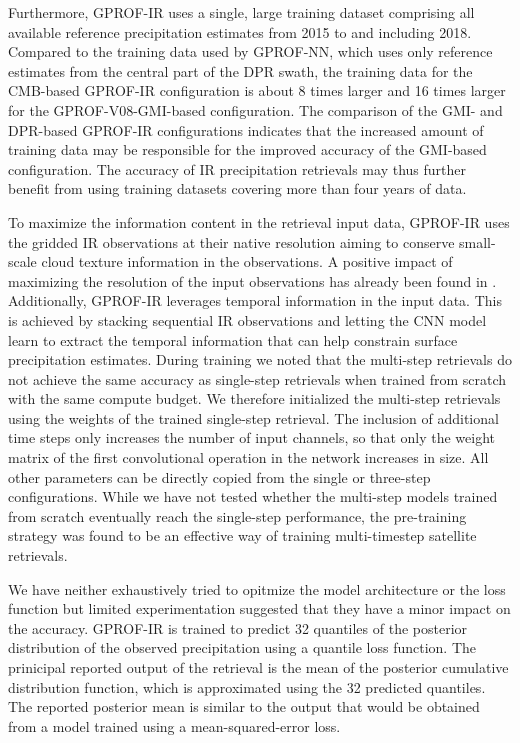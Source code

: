 \documentclass{ametsocV6.1}
\begin{document}
Furthermore, GPROF-IR uses a single, large training dataset comprising all
available reference precipitation estimates from 2015 to and including 2018.
Compared to the training data used by GPROF-NN, which uses only reference
estimates from the central part of the DPR swath, the training data for the
CMB-based GPROF-IR configuration is about 8 times larger and 16 times larger for
the GPROF-V08-GMI-based configuration. The comparison of the GMI- and DPR-based
GPROF-IR configurations indicates that the increased amount of training data may
be responsible for the improved accuracy of the GMI-based configuration. The
accuracy of IR precipitation retrievals may thus further benefit from using
training datasets covering more than four years of data.

To maximize the information content in the retrieval input data, GPROF-IR uses
the gridded IR observations at their native resolution aiming to conserve
small-scale cloud texture information in the observations. A positive impact of maximizing the
resolution of the input observations has already been found in
\citet{pfreundschuh_improved_2022}. Additionally, GPROF-IR leverages temporal
information in the input data. This is achieved by stacking sequential IR
observations and letting the CNN model learn to extract the temporal information
that can help constrain surface precipitation estimates. During training we
noted that the multi-step retrievals do not achieve the same accuracy as
single-step retrievals when trained from scratch with the same compute budget.
We therefore initialized the multi-step retrievals using the weights of the
trained single-step retrieval. The inclusion of additional time steps only
increases the number of input channels, so that only the weight matrix of the
first convolutional operation in the network increases in size. All other
parameters can be directly copied from the single or three-step configurations.
While we have not tested whether the multi-step models trained from scratch
eventually reach the single-step performance, the pre-training strategy was found to be an
effective way of training multi-timestep satellite retrievals.

We have neither exhaustively tried to opitmize the model architecture or the
loss function but limited experimentation suggested that they have a minor
impact on the accuracy. GPROF-IR is trained to predict 32 quantiles of the
posterior distribution of the observed precipitation using a quantile loss
function. The prinicipal reported output of the retrieval is the mean of the
posterior cumulative distribution function, which is approximated using the 32
predicted quantiles. The reported posterior mean is similar to the output that
would be obtained from a model trained using a mean-squared-error loss.
\end{document}
